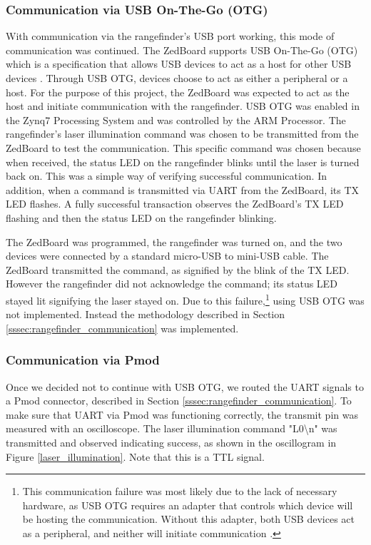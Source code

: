 \subsubsection{Communication via USB On-The-Go (OTG)}
With communication via the rangefinder's USB port working, this mode of communication was continued. The ZedBoard supports USB On-The-Go (OTG) which is a specification that allows USB devices to act as a host for other USB devices \cite{usb-otg}. Through USB OTG, devices choose to act as either a peripheral or a host. For the purpose of this project, the ZedBoard was expected to act as the host and initiate communication with the rangefinder. USB OTG was enabled in the Zynq7 Processing System and was controlled by the ARM Processor. The rangefinder's laser illumination command was chosen to be transmitted from the ZedBoard to test the communication. This specific command was chosen because when received, the status LED on the rangefinder blinks until the laser is turned back on. This was a simple way of verifying successful communication. In addition, when a command is transmitted via UART from the ZedBoard, its TX LED flashes. A fully successful transaction observes the ZedBoard's TX LED flashing and then the status LED on the rangefinder blinking.
\par
The ZedBoard was programmed, the rangefinder was turned on, and the two devices were connected by a standard micro-USB to mini-USB cable. The ZedBoard transmitted the command, as signified by the blink of the TX LED. However the rangefinder did not acknowledge the command; its status LED stayed lit signifying the laser stayed on. Due to this failure,\footnote{ This communication failure was most likely due to the lack of necessary hardware, as USB OTG requires an adapter that controls which device will be hosting the communication. Without this adapter, both USB devices act as a peripheral, and neither will initiate communication \cite{usb-otg}.} using USB OTG was not implemented. Instead the methodology described in Section \ref{sssec:rangefinder_communication} was implemented.

\subsubsection{Communication via Pmod}
Once we decided not to continue with USB OTG, we routed the UART signals to a Pmod connector, described in Section \ref{sssec:rangefinder_communication}. To make sure that UART via Pmod was functioning correctly, the transmit pin was measured with an oscilloscope. The laser illumination command "L0\textbackslash{}n" was transmitted and observed indicating success, as shown in the oscillogram in Figure \ref{laser_illumination}. Note that this is a TTL signal.

